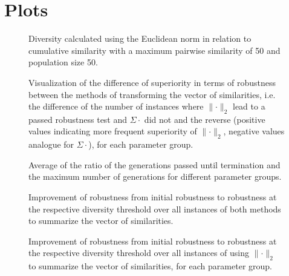 \documentclass{article}
\begin{document}
\section{Plots}
\begin{figure}[H]
\centering
 \caption{Diversity calculated using the Euclidean norm in relation to cumulative similarity with a maximum pairwise similarity of 50 and population size 50.}
\vskip-8pt
\end{figure}
\begin{figure}[H]
\centering
 \caption{Visualization of the difference of superiority in terms of robustness between the methods of transforming the vector of similarities, i.e. the difference of the number of instances where $\lVert \cdot \rVert _2$ lead to a passed robustness test and $\Sigma \cdot$ did not and the reverse (positive values indicating more frequent superiority of $\lVert \cdot \rVert_2$, negative values analogue for $\Sigma \cdot$), for each parameter group.}
\vskip-8pt
\end{figure}
\begin{figure}[H]
\centering
 \caption{Average of the ratio of the generations passed until termination and the maximum number of generations for different parameter groups.}
\vskip-8pt
\end{figure}
\begin{figure}[H]
\centering
 \caption{Improvement of robustness from initial robustness to robustness at the respective diversity threshold over all instances of both methods to summarize the vector of similarities.}
\vskip-8pt
\end{figure}
\begin{figure}[H]
\centering
 \caption{Improvement of robustness from initial robustness to robustness at the respective diversity threshold over all instances of using $\lVert \cdot \rVert_2$ to summarize the vector of similarities, for each parameter group.}
\vskip-8pt
\end{figure}
\newpage
\end{document}
